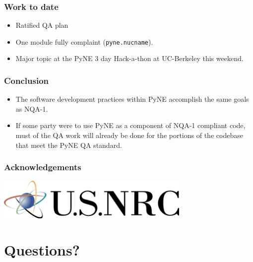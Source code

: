 \documentclass[12pt]{beamer}
\begin{document}
\begin{frame}
\frametitle{Work to date}

\begin{itemize}
\item{Ratified QA plan}
\item{One module fully complaint (\texttt{pyne.nucname}).}
\item{Major topic at the PyNE 3 day Hack-a-thon at UC-Berkeley this weekend.}
\end{itemize}

\end{frame}
\begin{frame}
\frametitle{Conclusion}

\begin{itemize}
\item{The software development practices within PyNE accomplish the same goals as NQA-1.}
\item{If some party were to use PyNE as a component of NQA-1 compliant code, must of the QA work will already be done for the portions of the codebase that meet the PyNE QA standard.}
\end{itemize}

\end{frame}
\begin{frame}[fragile]
\frametitle{Acknowledgements}

\includegraphics[height=2cm]{figures/NRClogo.png} \\

\end{frame}


\section*{Questions?}
\end{document}
